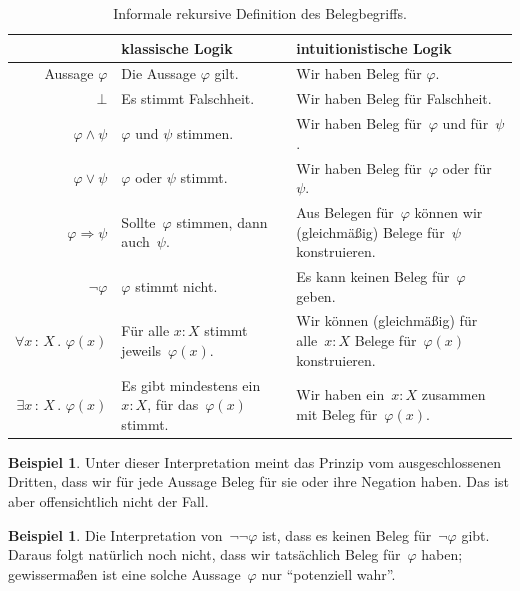 \documentclass[a4paper,ngerman,12pt]{scrartcl}
\theoremstyle{definition}
\newtheorem{bsp}[defn]{Beispiel}
\theoremstyle{plain}
\theoremstyle{remark}
\renewcommand{\_}{\mathpunct{.}\,}
\newcommand{\?}{\,{:}\,}
\begin{document}
\begin{table}
  \centering
  \small
  \renewcommand{\arraystretch}{1.3}
  \begin{tabular}{@{}rp{5.9cm}p{6.5cm}@{}}
    \toprule
    & {klassische Logik} & {intuitionistische Logik}
    \\\midrule
    Aussage $\varphi$ & Die Aussage $\varphi$ gilt. & Wir haben Beleg für $\varphi$. \\
    $\bot$ & Es stimmt Falschheit. & Wir haben Beleg für Falschheit. \\
    $\varphi \wedge \psi$ & $\varphi$ und $\psi$ stimmen. & Wir haben Beleg für~$\varphi$ und für~$\psi$. \\
    $\varphi \vee \psi$ & $\varphi$ oder $\psi$ stimmt. & Wir haben Beleg für~$\varphi$ oder für~$\psi$. \\
    $\varphi \Rightarrow \psi$ & Sollte~$\varphi$ stimmen, dann auch~$\psi$. &
    Aus Belegen für~$\varphi$ können wir (gleich\-mä\-ßig) Belege für~$\psi$ konstruieren. \\
    $\neg\varphi$ &
      $\varphi$ stimmt nicht. &
      Es kann keinen Beleg für~$\varphi$ geben. \\
    $\forall x\?X\_ \varphi(x)$ & Für alle $x : X$ stimmt jeweils~$\varphi(x).$ &
      Wir können (gleichmäßig) für alle~$x : X$ Belege für~$\varphi(x)$ konstruieren. \\
    $\exists x\?X\_ \varphi(x)$ & \raggedright Es gibt mindestens ein~$x : X$, für das~$\varphi(x)$
    stimmt. & {\raggedright
      Wir haben ein~$x : X$ zusammen mit Beleg für~$\varphi(x).$} \\
    \bottomrule
  \end{tabular}
  \caption{\label{bhk}Informale rekursive Definition des Belegbegriffs.}
\end{table}

\begin{bsp}
Unter dieser Interpretation meint das Prinzip vom ausgeschlossenen Dritten, dass wir für jede
Aussage Beleg für sie oder ihre Negation haben. Das ist aber offensichtlich
nicht der Fall.
\end{bsp}

\begin{bsp}
Die Interpretation von~$\neg\neg\varphi$ ist, dass es keinen Beleg
für~$\neg\varphi$ gibt. Daraus folgt natürlich noch nicht, dass wir tatsächlich
Beleg für~$\varphi$ haben; gewissermaßen ist eine solche Aussage~$\varphi$ nur
"`potenziell wahr"'.
\end{bsp}
\end{document}
